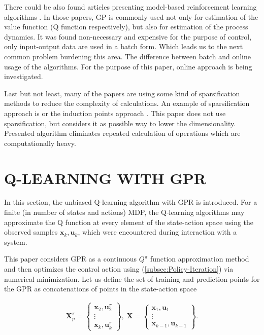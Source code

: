 \documentclass{ifacconf}
\begin{document}
There could be also found articles presenting model-based reinforcement
learning algorithms \citep{ecc19ref:Jung_GP_RMAXlike_Exploration,ecc19ref:Rasmussen_GP_in_RL}. In those papers, GP is commonly used not only for estimation of the value function (Q function respectively), but also for estimation of the process dynamics. It was found non-necessary and expensive for the purpose of control, only input-output data are used in a batch form. Which leads us to the next common problem burdening this area. The difference between batch and online usage of the algorithms. For the purpose of this paper, online approach is being investigated.

Last but not least, many of the papers are using some kind of sparsification
methods to reduce the complexity of calculations. An example of sparsification approach is \citep{ecc19ref:Csato_Sparse_Online_GP} or the induction points approach \citep{ecc19ref:Bijl_Online_Sparse_Gaussian}. This paper does not use sparsification, but considers it as possible way to lower the dimensionality. Presented algorithm eliminates repeated calculation of operations which are computationally heavy.

\section{Q-LEARNING WITH GPR}\label{sec:Q-LEARNING-WITH-GPR}

In this section, the unbiased Q-learning algorithm with GPR is introduced.
For a finite (in number of states and actions) MDP, the Q-learning
algorithms may approximate the Q function at every element of the
state-action space using the observed samples $\mathbf{x}_{k},\mathbf{u}_{k}$,
which were encountered during interaction with a system.

This paper considers GPR as a continuous $Q^{\pi}$ function approximation
method and then optimizes the control action using (\ref{subsec:Policy-Iteration})
via numerical minimization. Let us define the set of training and
prediction points for the GPR as concatenations of points in the state-action
space

\begin{gather*}
\mathbf{X}_{p}^{\pi}=\left\{ \begin{array}{c}
\mathbf{x}_{2},\mathbf{u}_{2}^{\pi}\\
\vdots\\
\mathbf{x}_{k},\mathbf{u}_{k}^{\pi}
\end{array}\right\} ,\;\mathbf{X}=\left\{ \begin{array}{c}
\mathbf{x}_{1},\mathbf{u}_{1}\\
\vdots\\
\mathbf{x}_{k-1},\mathbf{u}_{k-1}
\end{array}\right\} .
\end{gather*}
\end{document}
